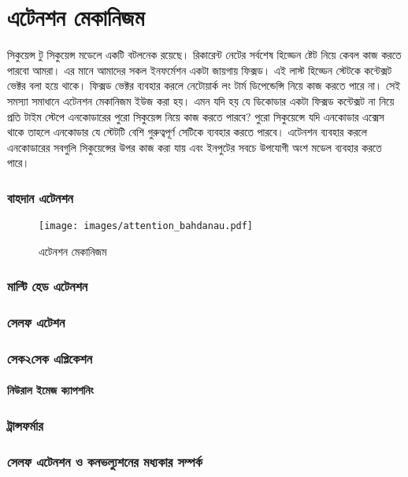 \documentclass{book}
\begin{document}
\chapter{এটেনশন মেকানিজম}
সিকুয়েন্স টু সিকুয়েন্স মডেলে একটি বটলনেক রয়েছে। রিকারেন্ট নেটের সর্বশেষ হিড্ডেন ষ্টেট নিয়ে কেবল কাজ করতে পারবো আমরা। এর মানে আমাদের সকল ইনফর্মেশন একটা জায়গায় ফিক্সড।
এই লাস্ট হিড্ডেন স্টেটকে কন্টেক্সট ভেক্টর বলা হয়ে থাকে। ফিক্সড ভেক্টর ব্যবহার করলে নেটোয়ার্ক লং টার্ম ডিপেন্ডেন্সি নিয়ে কাজ করতে পারে না।
 সেই সমস্যা সমাধানে এটেনশন মেকানিজম ইউজ করা হয়। এমন যদি হয় যে ডিকোডার একটা ফিক্সড কন্টেক্সট না নিয়ে প্রতি টাইম স্টেপে এনকোডারের পুরো সিকুয়েন্স নিয়ে কাজ করতে পারবে?
 পুরো সিকুয়েন্সে যদি এনকোডার এক্সেস থাকে তাহলে এনকোডার যে স্টেটটি বেশি গুরুত্বপূর্ণ সেটিকে ব্যবহার করতে পারবে।  
 এটেনশন ব্যবহার করলে এনকোডারের সবগুলি সিকুয়েন্সের উপর কাজ করা যায় এবং ইনপুটের সবচে উপযোগী অংশ মডেল ব্যবহার করতে পারে। 

\subsection{বাহদান এটেনশন}

\begin{figure}[htbp] %
   \centering
   \texttt{[image: images/attention\_bahdanau.pdf]} 
   \caption{এটেনশন মেকানিজম}
   \label{fig:attn_bahdanau}
\end{figure} 

\subsection{মাল্টি হেড এটেনশন}

\subsection{সেলফ এটেশন}
\subsection{সেক২সেক এপ্লিকেশন}
\subsubsection{নিউরাল ইমেজ ক্যাপশনিং}
\subsection{ট্রান্সফর্মার}
\subsection{সেলফ এটেনশন ও কনভল্যুশনের মধ্যকার সম্পর্ক}
\end{document}
